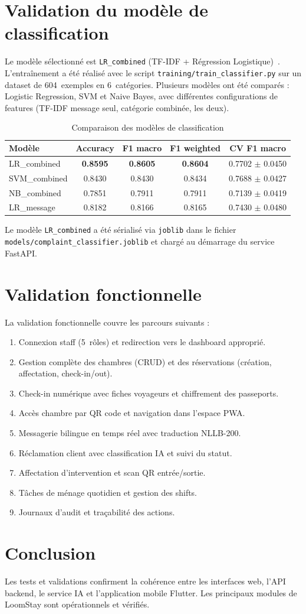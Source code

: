 \section{Validation du modèle de classification}
Le modèle sélectionné est \texttt{LR\_combined} (TF-IDF + Régression Logistique)~\cite{scikitlearn}. L'entraînement a été réalisé avec le script \texttt{training/train\_classifier.py} sur un dataset de 604~exemples en 6~catégories. Plusieurs modèles ont été comparés : Logistic Regression, SVM et Naive Bayes, avec différentes configurations de features (TF-IDF message seul, catégorie combinée, les deux).

\begin{table}[H]
\centering
\caption{Comparaison des modèles de classification}
\small
\begin{tabular}{|l|c|c|c|c|}
\hline
\textbf{Modèle} & \textbf{Accuracy} & \textbf{F1 macro} & \textbf{F1 weighted} & \textbf{CV F1 macro} \\ \hline
LR\_combined & \textbf{0.8595} & \textbf{0.8605} & \textbf{0.8604} & 0.7702 $\pm$ 0.0450 \\ \hline
SVM\_combined & 0.8430 & 0.8430 & 0.8434 & 0.7688 $\pm$ 0.0427 \\ \hline
NB\_combined & 0.7851 & 0.7911 & 0.7911 & 0.7139 $\pm$ 0.0419 \\ \hline
LR\_message & 0.8182 & 0.8166 & 0.8165 & 0.7430 $\pm$ 0.0480 \\ \hline
\end{tabular}
\label{tab:model_comparison}
\end{table}

Le modèle \texttt{LR\_combined} a été sérialisé via \texttt{joblib} dans le fichier \texttt{models/complaint\_classifier.joblib} et chargé au démarrage du service FastAPI.

\section{Validation fonctionnelle}
La validation fonctionnelle couvre les parcours suivants :
\begin{enumerate}
\item Connexion staff (5~rôles) et redirection vers le dashboard approprié.
\item Gestion complète des chambres (CRUD) et des réservations (création, affectation, check-in/out).
\item Check-in numérique avec fiches voyageurs et chiffrement des passeports.
\item Accès chambre par QR code et navigation dans l'espace PWA.
\item Messagerie bilingue en temps réel avec traduction NLLB-200.
\item Réclamation client avec classification IA et suivi du statut.
\item Affectation d'intervention et scan QR entrée/sortie.
\item Tâches de ménage quotidien et gestion des shifts.
\item Journaux d'audit et traçabilité des actions.
\end{enumerate}

\section*{Conclusion}
Les tests et validations confirment la cohérence entre les interfaces web, l'API backend, le service IA et l'application mobile Flutter. Les principaux modules de LoomStay sont opérationnels et vérifiés.
